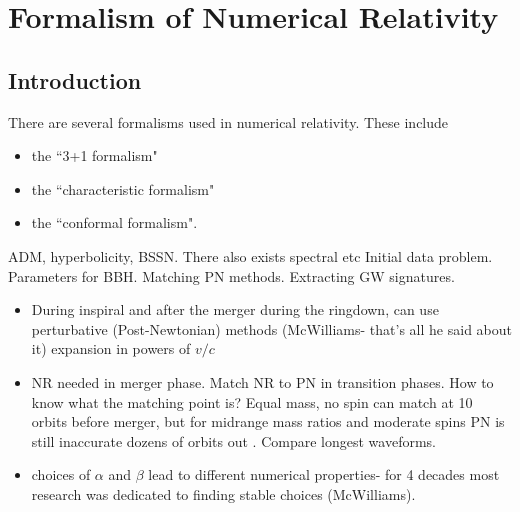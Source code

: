 %

\chapter{Formalism of Numerical Relativity}      
     
\section{Introduction}     
There are several formalisms used in numerical relativity. These include 
\begin{itemize}
\item the ``3+1 formalism"
\item the ``characteristic formalism"
\item the ``conformal formalism".
\end{itemize}

ADM, hyperbolicity, BSSN. There also exists spectral etc
Initial data problem. Parameters for BBH.
Matching PN methods.
Extracting GW signatures.

\begin{itemize}
\item During inspiral and after the merger during the ringdown, can use perturbative (Post-Newtonian) methods (McWilliams- that's all he said about it) expansion in powers of $v/c$
\item NR needed in merger phase. Match NR to PN in transition phases. How to know what the matching point is? Equal mass, no spin can match at 10 orbits before merger, but for midrange mass ratios and moderate spins PN is still inaccurate dozens of orbits out \cite{Scheel2013}. Compare longest waveforms.
\item choices of $\alpha$ and $\beta$ lead to different numerical properties- for 4 decades most research was dedicated to finding stable choices (McWilliams). 
\end{itemize}

